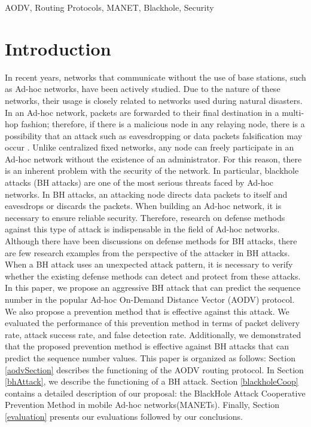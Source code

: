 \documentclass[conference]{IEEEtran}
\begin{document}
\begin{IEEEkeywords}
AODV, Routing Protocols, MANET, Blackhole, Security
\end{IEEEkeywords}

\section{Introduction}
In recent years, networks that communicate without the use of base stations, such as Ad-hoc networks, have been actively studied. Due to the nature of these networks, their usage is closely related to networks used during natural disasters. In an Ad-hoc network, packets are forwarded to their final destination in a multi-hop fashion; therefore, if there is a malicious node in any relaying node, there is a possibility that an attack such as eavesdropping or data packets falsification may occur \cite{1}. Unlike centralized fixed networks, any node can freely participate in an Ad-hoc network without the existence of an administrator. For this reason, there is an inherent problem with the security of the network. In particular, blackhole attacks (BH attacks) are one of the most serious threats faced by Ad-hoc networks. In BH attacks, an attacking node directs data packets to itself and eavesdrops or discards the packets. When building an Ad-hoc network, it is necessary to ensure reliable security. Therefore, research on defense methods against this type of attack is indispensable in the field of Ad-hoc networks. Although there have been discussions on defense methods for BH attacks, there are few research examples from the perspective of the attacker in BH attacks. When a BH attack uses an unexpected attack pattern, it is necessary to verify whether the existing defense methods can detect and protect from these attacks. In this paper, we propose an aggressive BH attack that can predict the sequence number in the popular Ad-hoc On-Demand Distance Vector (AODV) protocol. We also propose a prevention method that is effective against this attack. We evaluated the performance of this prevention method in terms of packet delivery rate, attack success rate, and false detection rate. Additionally, we demonstrated that the proposed prevention method is effective against BH attacks that can predict the sequence number values.  This paper is organized as follows: Section \ref{aodvSection} describes the functioning of the AODV routing protocol. In Section \ref{bhAttack}, we describe the functioning of a BH attack. Section \ref{blackholeCoop} contains a detailed description of our proposal: the BlackHole Attack Cooperative Prevention Method in mobile Ad-hoc networks(MANETs). Finally, Section \ref{evaluation} presents our evaluations followed by our conclusions.
\end{document}
